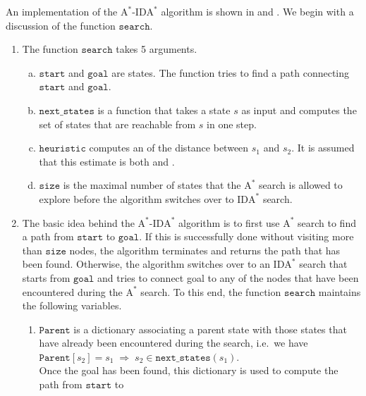 An implementation of the $\mathrm{A}^*$-$\mathrm{IDA}^*$ algorithm is shown in 
and .  We begin with a discussion of the function $\texttt{search}$.
\begin{enumerate}
\item The function $\texttt{search}$ takes 5 arguments.
      \begin{enumerate}[(a)]
      \item $\texttt{start}$ and $\texttt{goal}$ are states.  The function tries to find a path connecting
            $\texttt{start}$ and $\texttt{goal}$.
      \item $\texttt{next\_states}$ is a function that takes a state $s$ as input and computes the set of states that are
            reachable from $s$ in one step.
      \item $\texttt{heuristic}$ computes an  of the distance between $s_1$ and $s_2$.  It is
            assumed that this estimate is both  and .
      \item $\texttt{size}$ is the maximal number of states that the $\mathrm{A}^*$ search is allowed to
            explore before the algorithm switches over to $\mathrm{IDA}^*$ search.
      \end{enumerate}
\item The basic idea behind the $\mathrm{A}^*$-$\mathrm{IDA}^*$ algorithm is to first use $\mathrm{A}^*$ search
      to find a path from $\texttt{start}$ to $\texttt{goal}$.  If this is successfully done without visiting
      more than $\texttt{size}$ nodes, the algorithm terminates and returns the path that has been found.
      Otherwise, the algorithm switches over to an $\mathrm{IDA}^*$ search that starts from $\texttt{goal}$ and
      tries to connect goal to any of the nodes that have been encountered during the $\mathrm{A}^*$ search.
      To this end, the function $\texttt{search}$ maintains the following variables.
      \begin{enumerate}
      \item $\texttt{Parent}$ is a dictionary associating a parent state with those states that have already been
            encountered during the search, i.e.~we have
            \\[0.2cm]
            \hspace*{1.3cm}
            $\texttt{Parent}[s_2] = s_1 \;\Rightarrow\; s_2 \in \texttt{next\_states}(s_1)$.
            \\[0.2cm]
            Once the goal has been found, this dictionary is used to compute the path from $\texttt{start}$ to

\end{enumerate}
\end{enumerate}
